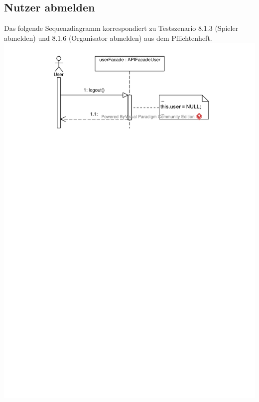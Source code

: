 \documentclass[a4paper]{scrreprt}
\begin{document}
	\subsection{Nutzer abmelden}
	Das folgende Sequenzdiagramm korrespondiert zu Testszenario 8.1.3 (Spieler abmelden) und 8.1.6 (Organisator abmelden) aus dem Pflichtenheft. \\
	\includegraphics[width=\textwidth]{img/Nutzer_abmelden.pdf}
\end{document}

